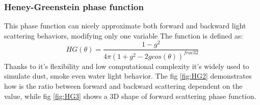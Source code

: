 \subsubsection{Heney-Greenstein phase function}
This phase function can nicely approximate both forward and backward light scattering behaviors, modifying only one variable  The function is defined as:
\begin{equation}
\label{eq:HENEYGREEN}
HG(\theta)=\frac{1-g^{2}}{4\pi(1+g^{2}-2gcos(\theta))^{frac{3}{2}}}
\end{equation}
Thanks to it's flexibility and low computational complexity it's widely used to simulate dust, smoke even water light behavior. The fig \ref{fig:HG2} demonstrates how is the ratio between forward and backward scattering dependent on the  value, while fig \ref{fig:HG3} shows a 3D shape of forward scattering phase function.

